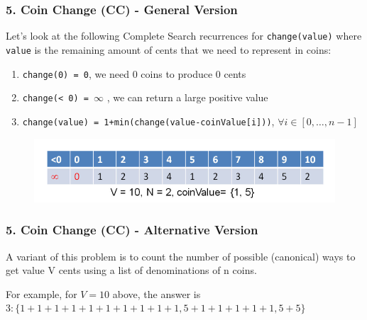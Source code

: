 \documentclass{beamer}
\begin{document}
\begin{frame}[fragile]
\frametitle{5. Coin Change (CC) - General Version}

Let's look at the following Complete Search recurrences for \verb|change(value)| where \verb|value| is the remaining amount of cents that we need to represent in coins:

\begin{enumerate}
    \item \color{blue}\verb|change(0) = 0|\color{black}, we need 0 coins to produce 0 cents
    \pause
    \item \color{blue}\verb|change(< 0) = |$\infty$ \color{black}, we can return a large positive value
    
    \pause
    \item \color{blue}\verb|change(value) = 1+min(change(value-coinValue[i]))|\color{black}, $\forall i \in [0,\ldots,n-1]$    
\end{enumerate}

\begin{figure}
    \centering
    \includegraphics[scale=0.5]{imgs/cc.png}
\end{figure}

\end{frame}

\begin{frame}[fragile]
\frametitle{5. Coin Change (CC) - Alternative Version}

A variant of this problem is to count the number of possible (canonical) ways to get value V cents using a list of denominations of n coins. \\

\vspace{0.3cm}

For example, for $V=10$ above, the answer is $3: \{1+1+1+1+1 + 1+1+1+1+1, 5 + 1+1+1+1+1, 5 + 5\}$

\end{frame}
\end{document}
